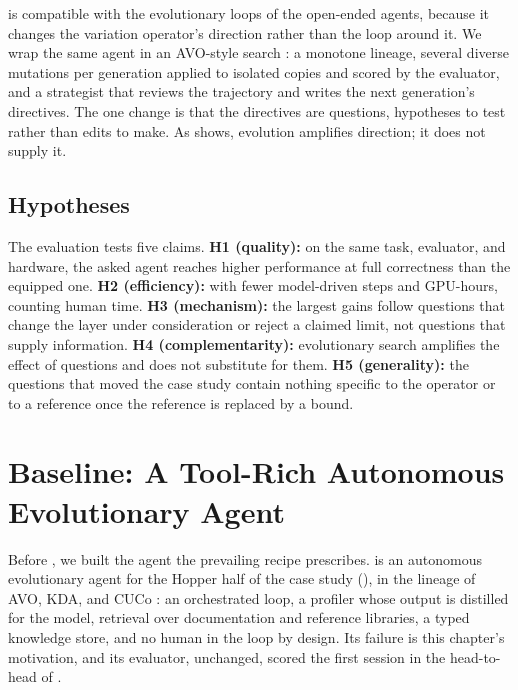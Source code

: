 \KernelSeek is compatible with the evolutionary loops of the open-ended agents, because it changes the
variation operator's direction rather than the loop around it. We wrap the same agent in an
AVO-style search \cite{chen2026avo}: a monotone lineage, several diverse mutations per generation
applied to isolated copies and scored by the evaluator, and a strategist that reviews the trajectory
and writes the next generation's directives. The one change is that the directives are questions,
hypotheses to test rather than edits to make. As  shows, evolution amplifies direction; it does not
supply it.

\subsection{Hypotheses}
\label{kernelseek:sec:hypotheses}

The evaluation tests five claims. \textbf{H1 (quality):} on the same task, evaluator, and hardware,
the asked agent reaches higher performance at full correctness than the equipped one.
\textbf{H2 (efficiency):} with fewer model-driven steps and GPU-hours, counting human time.
\textbf{H3 (mechanism):} the largest gains follow questions that change the layer under
consideration or reject a claimed limit, not questions that supply information.
\textbf{H4 (complementarity):} evolutionary search amplifies the effect of questions and does not
substitute for them. \textbf{H5 (generality):} the questions that moved the case study contain
nothing specific to the operator or to a reference once the reference is replaced by a bound.

\section{Baseline: A Tool-Rich Autonomous Evolutionary Agent}
\label{kernelseek:sec:baseline}

Before \KernelSeek, we built the agent the prevailing recipe prescribes. \ksBaseline is an autonomous
evolutionary agent for the Hopper half of the case study (), in the lineage of
AVO, KDA, and CUCo \cite{chen2026avo,han2026kda,cuco2026}: an orchestrated loop, a profiler whose
output is distilled for the model, retrieval over documentation and reference libraries, a typed
knowledge store, and no human in the loop by design. Its failure is this chapter's motivation, and its
evaluator, unchanged, scored the first \KernelSeek session in the head-to-head of .

